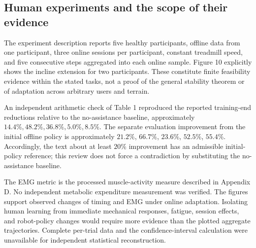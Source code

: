 \documentclass[10pt]{article}
\begin{document}
\subsection*{Human experiments and the scope of their evidence}
The experiment description reports five healthy participants, offline data from one participant, three online sessions per participant, constant treadmill speed, and five consecutive steps aggregated into each online sample. Figure 10 explicitly shows the incline extension for two participants. These constitute finite feasibility evidence within the stated tasks, not a proof of the general stability theorem or of adaptation across arbitrary users and terrain.\par
An independent arithmetic check of Table 1 reproduced the reported training-end reductions relative to the no-assistance baseline, approximately \(14.4\%,48.2\%,36.8\%,5.0\%,8.5\%\). The separate evaluation improvement from the initial offline policy is approximately \(21.2\%\), \(66.7\%\), \(23.6\%\), \(52.5\%\), \(55.4\%\). Accordingly, the text about at least \(20\%\) improvement has an admissible initial-policy reference; this review does not force a contradiction by substituting the no-assistance baseline.\par
The EMG metric is the processed muscle-activity measure described in Appendix D. No independent metabolic expenditure measurement was verified. The figures support observed changes of timing and EMG under online adaptation. Isolating human learning from immediate mechanical responses, fatigue, session effects, and robot-policy changes would require more evidence than the plotted aggregate trajectories. Complete per-trial data and the confidence-interval calculation were unavailable for independent statistical reconstruction.\par
\end{document}
